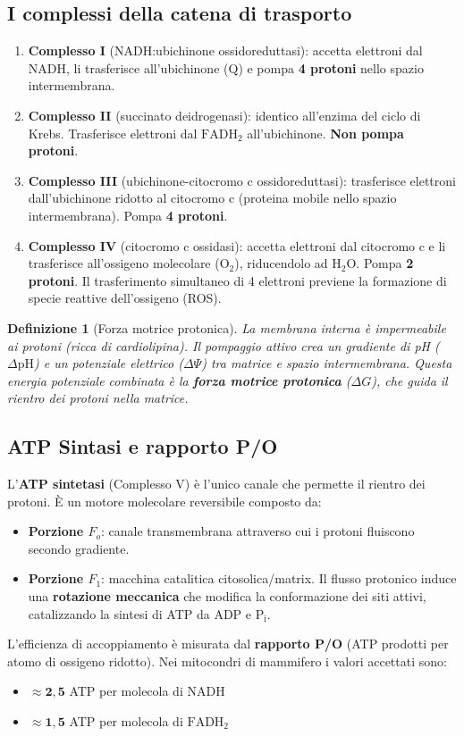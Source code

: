 \documentclass[12pt,a4paper]{report}
\newtheorem{definizione}{Definizione}[section]
\begin{document}
\subsection{I complessi della catena di trasporto}
\begin{enumerate}
\item \textbf{Complesso I} (NADH:ubichinone ossidoreduttasi): accetta elettroni dal \(\mathrm{NADH}\), li trasferisce all'ubichinone (\(\mathrm{Q}\)) e pompa \textbf{4 protoni} nello spazio intermembrana.
\item \textbf{Complesso II} (succinato deidrogenasi): identico all'enzima del ciclo di Krebs. Trasferisce elettroni dal \(\mathrm{FADH_2}\) all'ubichinone. \textbf{Non pompa protoni}.
\item \textbf{Complesso III} (ubichinone-citocromo c ossidoreduttasi): trasferisce elettroni dall'ubichinone ridotto al citocromo c (proteina mobile nello spazio intermembrana). Pompa \textbf{4 protoni}.
\item \textbf{Complesso IV} (citocromo c ossidasi): accetta elettroni dal citocromo c e li trasferisce all'ossigeno molecolare (\(\mathrm{O_2}\)), riducendolo ad \(\mathrm{H_2O}\). Pompa \textbf{2 protoni}. Il trasferimento simultaneo di 4 elettroni previene la formazione di specie reattive dell'ossigeno (ROS).
\end{enumerate}
\begin{definizione}[Forza motrice protonica]
La membrana interna è impermeabile ai protoni (ricca di cardiolipina). Il pompaggio attivo crea un gradiente di pH (\(\Delta \mathrm{pH}\)) e un potenziale elettrico (\(\Delta \Psi\)) tra matrice e spazio intermembrana. Questa energia potenziale combinata è la \textbf{forza motrice protonica} (\(\Delta G\)), che guida il rientro dei protoni nella matrice.
\end{definizione}
\subsection{ATP Sintasi e rapporto P/O}
L'\textbf{ATP sintetasi} (Complesso V) è l'unico canale che permette il rientro dei protoni. È un motore molecolare reversibile composto da:
\begin{itemize}
\item \textbf{Porzione \(F_o\)}: canale transmembrana attraverso cui i protoni fluiscono secondo gradiente.
\item \textbf{Porzione \(F_1\)}: macchina catalitica citosolica/matrix. Il flusso protonico induce una \textbf{rotazione meccanica} che modifica la conformazione dei siti attivi, catalizzando la sintesi di ATP da ADP e \(\mathrm{P_i}\).
\end{itemize}
L'efficienza di accoppiamento è misurata dal \textbf{rapporto P/O} (ATP prodotti per atomo di ossigeno ridotto). Nei mitocondri di mammifero i valori accettati sono:
\begin{itemize}
\item \(\approx \mathbf{2{,}5}\) ATP per molecola di \(\mathrm{NADH}\)
\item \(\approx \mathbf{1{,}5}\) ATP per molecola di \(\mathrm{FADH_2}\)
\end{itemize}
\end{document}
